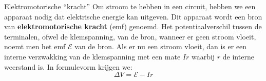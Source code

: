 \begin{theo}{Elektromotorische “kracht”}
    Om stroom te hebben in een circuit, hebben we een apparaat nodig dat elektrische energie kan uitgeven. Dit apparaat wordt een bron van \textbf{elektromotorische kracht} (emf) genoemd.
    Het potentiaalverschil tussen de terminalen, ofwel de klemspanning, van de bron, wanneer er geen stroom vloeit, noemt men het emf $\mathcal{E}$ van de bron. Als er nu een stroom vloeit, dan is er een interne verzwakking van de klemspanning met een mate $Ir$ waarbij $r$ de interne weerstand is. In formulevorm krijgen we:
    \begin{equation*}
        \Delta V = \mathcal{E} - Ir
    \end{equation*}

    \begin{center}
        

\end{center}
\end{theo}
